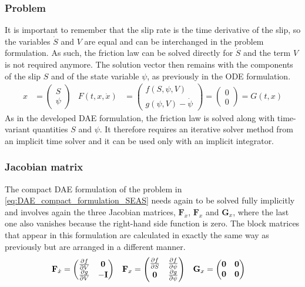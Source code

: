 \subsubsection{Problem}
It is important to remember that the slip rate is the time derivative of the slip, so the variables $\dot{S}$ and $V$ are equal and can be interchanged in the problem formulation. As such, the friction law can be solved directly for $\dot{S}$ and the term $V$ is not required anymore. The solution vector then remains with the components of the slip $S$ and of the state variable $\psi$, as previously in the ODE formulation.
 \begin{align}
	\label{eq:DAE_compact_formulation_SEAS}
	x &= \begin{pmatrix}
			S \\ \psi
	     \end{pmatrix} & F(t, x,\dot{x}) &= \begin{pmatrix}
												f(S,\psi,V) \\ g(\psi, V) - \dot{\psi}
											\end{pmatrix} = \begin{pmatrix}
																0 \\ 0
															\end{pmatrix} = G(t,x)
\end{align}
As in the developed DAE formulation, the friction law is solved along with time-variant quantities $S$ and $\psi$. It therefore requires an iterative solver method from an implicit time solver and it can be used only with an implicit integrator. \\

\subsubsection{Jacobian matrix}
The compact DAE formulation of the problem in \autoref{eq:DAE_compact_formulation_SEAS} needs again to be solved fully implicitly and involves again the three Jacobian matrices, $\mathbf{F}_{\dot{x}}$, $\mathbf{F}_x$ and $\mathbf{G}_x$, where the last one also vanishes because the right-hand side function is zero. The block matrices that appear in this formulation are calculated in exactly the same way as previously but are arranged in a different manner.
\begin{align}
	\label{eq:Jacobian_compact_DAE}
	\mathbf{F}_{\dot{x}}&=  \begin{pmatrix}
								\pdv{f}{V} &  \mathbf{0} \\
							    \pdv{g}{V} & -\mathbf{I}
							\end{pmatrix} & 
	\mathbf{F}_x        &=  \begin{pmatrix}
								\pdv{f}{S} & \pdv{f}{\psi} \\
								\mathbf{0} & \pdv{g}{\psi}
							\end{pmatrix} & 
	\mathbf{G}_x        &=  \begin{pmatrix}
								\mathbf{0} & \mathbf{0} \\
							    \mathbf{0} & \mathbf{0}
							\end{pmatrix}
\end{align}

